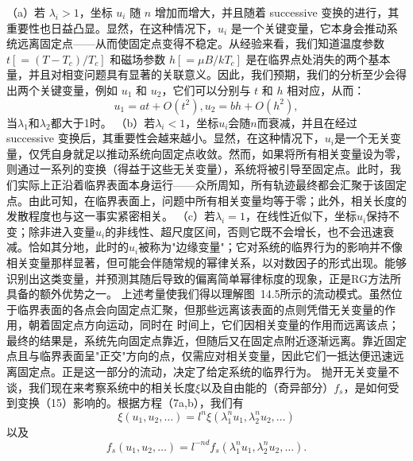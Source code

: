 （a）若 \(\lambda_{i} > 1\)，坐标 \(u_{i}\) 随 \(n\) 增加而增大，并且随着 successive 变换的进行，其重要性也日益凸显。显然，在这种情况下，\(u_{i}\) 是一个关键变量，它本身会推动系统远离固定点——从而使固定点变得不稳定。从经验来看，我们知道温度参数 \(t \left[ = (T - T_{c})/T_{c} \right]\) 和磁场参数 \(h \left[ = \mu B/kT_{c} \right]\) 是在临界点处消失的两个基本量，并且对相变问题具有显著的关联意义。因此，我们预期，我们的分析至少会得出两个关键变量，例如 \(u_{1}\) 和 \(u_{2}\)，它们可以分别与 \(t\) 和 \(h\) 相对应，从而：
\begin{equation}\tag{14.3.12}\label{eq:14.3.12}
u _ { 1 } = a t + O ( t ^{2} ) ,  u _ { 2 } = b h + O ( h ^{2} ) ,
\end{equation}
当\(\lambda_{1}\)和\(\lambda_{2}\)都大于1时。
（b）若\(\lambda_{i} < 1\)，坐标\(u_{i}\)会随\(n\)而衰减，并且在经过 successive 变换后，其重要性会越来越小。显然，在这种情况下，\(u_{i}\)是一个无关变量，仅凭自身就足以推动系统向固定点收敛。然而，如果将所有相关变量设为零，则通过一系列的变换（得益于这些无关变量），系统将被引导至固定点。此时，我们实际上正沿着临界表面本身运行——众所周知，所有轨迹最终都会汇聚于该固定点。由此可知，在临界表面上，问题中所有相关变量均等于零；此外，相关长度的发散程度也与这一事实紧密相关。
（c）若\(\lambda_{i} = 1\)，在线性近似下，坐标\(u_{i}\)保持不变；除非进入变量\(u_{i}\)的非线性、超尺度区间，否则它既不会增长，也不会迅速衰减。恰如其分地，此时的\(u_{i}\)被称为"边缘变量"；它对系统的临界行为的影响并不像相关变量那样显著，但可能会伴随常规的幂律关系，以对数因子的形式出现。能够识别出这类变量，并预测其随后导致的偏离简单幂律标度的现象，正是RG方法所具备的额外优势之一。
上述考量使我们得以理解图~14.5所示的流动模式。虽然位于临界表面的各点会向固定点汇聚，但那些远离该表面的点则凭借无关变量的作用，朝着固定点方向运动，同时在
时间上，它们因相关变量的作用而远离该点；最终的结果是，系统先向固定点靠近，但随后又在固定点附近逐渐远离。靠近固定点且与临界表面呈"正交"方向的点，仅需应对相关变量，因此它们一抵达便迅速远离固定点。正是这一部分的流动，决定了给定系统的临界行为。
抛开无关变量不谈，我们现在来考察系统中的相关长度\(\xi\)以及自由能的（奇异部分）\(f_{s}\)，是如何受到变换（15）影响的。根据方程（7a,b），我们有
\begin{equation}\tag{14.3.13}\label{eq:14.3.13}
\xi ( u _ { 1 } , u _ { 2 } , \ldots ) = l ^{n} \xi ( \lambda _ { 1 } ^{n} u _ { 1 } , \lambda _ { 2 } ^{n} u _ { 2 } , \ldots )
\end{equation}
以及
\begin{equation}\tag{14.3.14}\label{eq:14.3.14}
f _ { s } ( u _ { 1 } , u _ { 2 } , \ldots ) = l ^{- n d} f _ { s } ( \lambda _ { 1 } ^{n} u _ { 1 } , \lambda _ { 2 } ^{n} u _ { 2 } , \ldots ) .
\end{equation}
